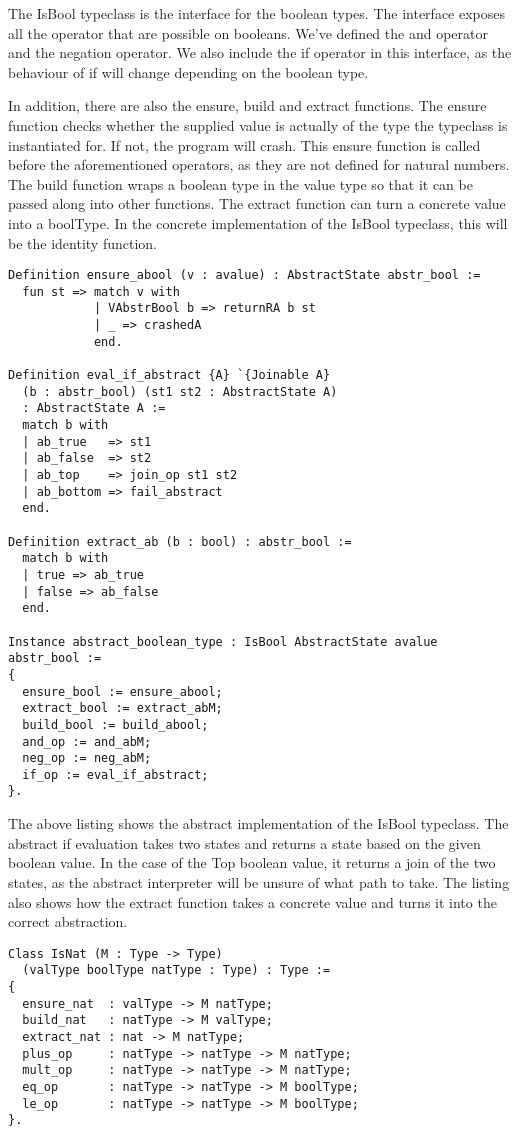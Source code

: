 The IsBool typeclass is the interface for the boolean types. The interface
exposes all the operator that are possible on booleans. We've defined the and
operator and the negation operator. We also include the if operator in this
interface, as the behaviour of if will change depending on the boolean type. 

In addition, there are also the ensure, build and extract functions. The ensure
function checks whether the supplied value is actually of the type the
typeclass is instantiated for. If not, the program will crash. This ensure
function is called before the aforementioned operators, as they are not defined
for natural numbers. The build function wraps a boolean type in the value type
so that it can be passed along into other functions. The extract function can
turn a concrete value into a boolType. In the concrete implementation
of the IsBool typeclass, this will be the identity function.

\begin{verbatim}
Definition ensure_abool (v : avalue) : AbstractState abstr_bool :=
  fun st => match v with
            | VAbstrBool b => returnRA b st
            | _ => crashedA
            end.

Definition eval_if_abstract {A} `{Joinable A} 
  (b : abstr_bool) (st1 st2 : AbstractState A) 
  : AbstractState A :=
  match b with
  | ab_true   => st1
  | ab_false  => st2
  | ab_top    => join_op st1 st2
  | ab_bottom => fail_abstract
  end.

Definition extract_ab (b : bool) : abstr_bool := 
  match b with
  | true => ab_true
  | false => ab_false
  end.

Instance abstract_boolean_type : IsBool AbstractState avalue abstr_bool :=
{
  ensure_bool := ensure_abool;
  extract_bool := extract_abM;
  build_bool := build_abool;
  and_op := and_abM;
  neg_op := neg_abM;
  if_op := eval_if_abstract;
}.
\end{verbatim}

The above listing shows the abstract implementation of the IsBool typeclass.
The abstract if evaluation takes two states and returns a state based on the
given boolean value. In the case of the Top boolean value, it returns a join of
the two states, as the abstract interpreter will be unsure of what path to
take. The listing also shows how the extract function takes a concrete value
and turns it into the correct abstraction.

\begin{verbatim}
Class IsNat (M : Type -> Type)
  (valType boolType natType : Type) : Type :=
{
  ensure_nat  : valType -> M natType;
  build_nat   : natType -> M valType;
  extract_nat : nat -> M natType;
  plus_op     : natType -> natType -> M natType;
  mult_op     : natType -> natType -> M natType;
  eq_op       : natType -> natType -> M boolType;
  le_op       : natType -> natType -> M boolType;
}.
\end{verbatim}

